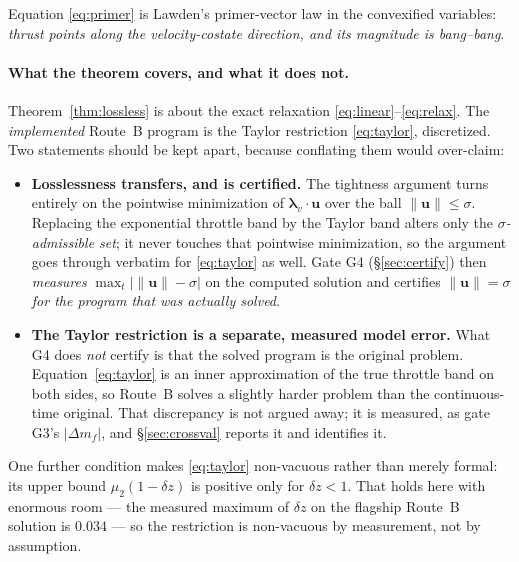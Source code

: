 \documentclass[11pt]{article}
\newcommand{\uvec}{\mathbf{u}}
\newcommand{\lamv}{\boldsymbol{\lambda}_v}
\begin{document}
Equation \eqref{eq:primer} is Lawden's primer-vector law
\cite{lawden1963} in the convexified variables: \emph{thrust points along
the velocity-costate direction, and its magnitude is bang--bang}.

\paragraph{What the theorem covers, and what it does not.}
Theorem~\ref{thm:lossless} is about the exact relaxation
\eqref{eq:linear}--\eqref{eq:relax}. The \emph{implemented} Route~B program
is the Taylor restriction \eqref{eq:taylor}, discretized. Two statements
should be kept apart, because conflating them would over-claim:
%
\begin{itemize}
\item \textbf{Losslessness transfers, and is certified.} The tightness
argument turns entirely on the pointwise minimization of
$\lamv\!\cdot\!\uvec$ over the ball $\lVert\uvec\rVert \le \sigma$. Replacing
the exponential throttle band by the Taylor band alters only the
\emph{$\sigma$-admissible set}; it never touches that pointwise
minimization, so the argument goes through verbatim for
\eqref{eq:taylor} as well. Gate G4 (\S\ref{sec:certify}) then
\emph{measures} $\max_t\big|\lVert\uvec\rVert-\sigma\big|$ on the computed
solution and certifies $\lVert\uvec\rVert = \sigma$ \emph{for the program
that was actually solved}.
\item \textbf{The Taylor restriction is a separate, measured model error.}
What G4 does \emph{not} certify is that the solved program is the original
problem. Equation~\eqref{eq:taylor} is an inner approximation of the true
throttle band on both sides, so Route~B solves a slightly harder problem
than the continuous-time original. That discrepancy is not argued away; it
is measured, as gate G3's $|\Delta m_f|$, and \S\ref{sec:crossval} reports
it and identifies it.
\end{itemize}
%
One further condition makes \eqref{eq:taylor} non-vacuous rather than merely
formal: its upper bound $\mu_2(1-\delta z)$ is positive only for
$\delta z < 1$. That holds here with enormous room --- the measured maximum
of $\delta z$ on the flagship Route~B solution is $0.034$ --- so the
restriction is non-vacuous by measurement, not by assumption.
\end{document}

